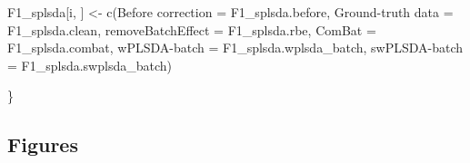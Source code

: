\documentclass[
]{book}
\newenvironment{Shaded}{\begin{snugshade}}{\end{snugshade}}
\newcommand{\AttributeTok}[1]{\textcolor[rgb]{0.77,0.63,0.00}{#1}}
\newcommand{\FunctionTok}[1]{\textcolor[rgb]{0.00,0.00,0.00}{#1}}
\newcommand{\NormalTok}[1]{#1}
\newcommand{\OtherTok}[1]{\textcolor[rgb]{0.56,0.35,0.01}{#1}}
\newcommand{\StringTok}[1]{\textcolor[rgb]{0.31,0.60,0.02}{#1}}
\begin{document}
\begin{Shaded}
\begin{Highlighting}[]
\NormalTok{  F1\_splsda[i, ] }\OtherTok{\textless{}{-}} \FunctionTok{c}\NormalTok{(}\StringTok{\textasciigrave{}}\AttributeTok{Before correction}\StringTok{\textasciigrave{}} \OtherTok{=}\NormalTok{ F1\_splsda.before, }
                      \StringTok{\textasciigrave{}}\AttributeTok{Ground{-}truth data}\StringTok{\textasciigrave{}} \OtherTok{=}\NormalTok{ F1\_splsda.clean,}
                      \StringTok{\textasciigrave{}}\AttributeTok{removeBatchEffect}\StringTok{\textasciigrave{}} \OtherTok{=}\NormalTok{ F1\_splsda.rbe,}
                      \AttributeTok{ComBat =}\NormalTok{ F1\_splsda.combat,}
                      \StringTok{\textasciigrave{}}\AttributeTok{wPLSDA{-}batch}\StringTok{\textasciigrave{}} \OtherTok{=}\NormalTok{ F1\_splsda.wplsda\_batch,}
                      \StringTok{\textasciigrave{}}\AttributeTok{swPLSDA{-}batch}\StringTok{\textasciigrave{}} \OtherTok{=}\NormalTok{ F1\_splsda.swplsda\_batch)}
  
\NormalTok{\}}
\end{Highlighting}
\end{Shaded}

\hypertarget{figures-1}{%
\subsection{Figures}\label{figures-1}}
\end{document}
